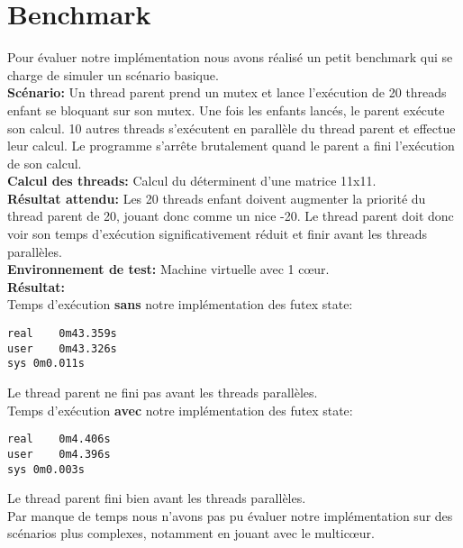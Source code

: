 \section{Benchmark}

Pour évaluer notre implémentation nous avons réalisé un petit benchmark qui se charge de simuler un
scénario basique.
\\

\noindent \textbf{Scénario:}
Un thread parent prend un mutex et lance l'exécution de 20 threads enfant se bloquant sur son mutex.
Une fois les enfants lancés, le parent exécute son calcul.
10 autres threads s'exécutent en parallèle du thread parent et effectue leur calcul.
Le programme s'arrête brutalement quand le parent a fini l'exécution de son calcul.
\\

\noindent \textbf{Calcul des threads:} 
Calcul du déterminent d'une matrice 11x11.
\\

\noindent \textbf{Résultat attendu:}
Les 20 threads enfant doivent augmenter la priorité du thread parent de 20,
jouant donc comme un nice -20. Le thread parent doit donc voir son temps d'exécution significativement
réduit et finir avant les threads parallèles.
\\

\noindent \textbf{Environnement de test:}
Machine virtuelle avec 1 cœur.
\\

\noindent \textbf{Résultat:}
\\
Temps d'exécution \textbf{sans} notre implémentation des futex state:
\begin{lstlisting}
real	0m43.359s
user	0m43.326s
sys	0m0.011s
\end{lstlisting}
Le thread parent ne fini pas avant les threads parallèles.
\\

\noindent Temps d'exécution \textbf{avec} notre implémentation des futex state:
\begin{lstlisting}
real	0m4.406s
user	0m4.396s
sys	0m0.003s
\end{lstlisting}
Le thread parent fini bien avant les threads parallèles.
\\

Par manque de temps nous n'avons pas pu évaluer notre implémentation sur des scénarios plus complexes,
notamment en jouant avec le multicœur. 